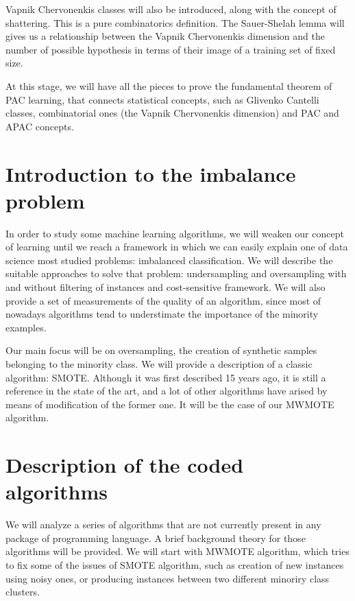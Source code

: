 Vapnik Chervonenkis classes will also be introduced, along with the concept of shattering. This is a pure combinatorics
definition. The Sauer-Shelah lemma will gives us a relationship between the Vapnik Chervonenkis dimension and the number
of possible hypothesis in terms of their image of a training set of fixed size. 

At this stage, we will have all the pieces to prove the fundamental theorem of PAC learning, that connects statistical
concepts, such as Glivenko Cantelli classes, combinatorial ones (the Vapnik Chervonenkis dimension) and PAC and APAC
concepts.

\section*{Introduction to the imbalance problem}

In order to study some machine learning algorithms, we will weaken our concept of learning until we reach a framework in which
we can easily explain one of data science most studied problems: imbalanced classification. We will describe the suitable
approaches to solve that problem: undersampling and oversampling with and without filtering of instances and cost-sensitive 
framework. We will also provide a set of measurements of the quality of an algorithm, since most of nowadays algorithms
tend to understimate the importance of the minority examples.


Our main focus will be on oversampling, the creation of synthetic samples belonging to the minority class. We will provide
a description of a classic algorithm: SMOTE. Although it was first described 15 years ago, it is still a reference in the
state of the art, and a lot of other algorithms have arised by means of modification of the former one. It will be the case
of our MWMOTE algorithm.

\section*{Description of the coded algorithms}

We will analyze a series of algorithms that are not currently present in any package of \R programming language. A brief 
background theory for those algorithms will be provided. We will start with MWMOTE algorithm, which tries to fix some of
the issues of SMOTE algorithm, such as creation of new instances using noisy ones, or producing instances between two
different minoriry class clusters.

